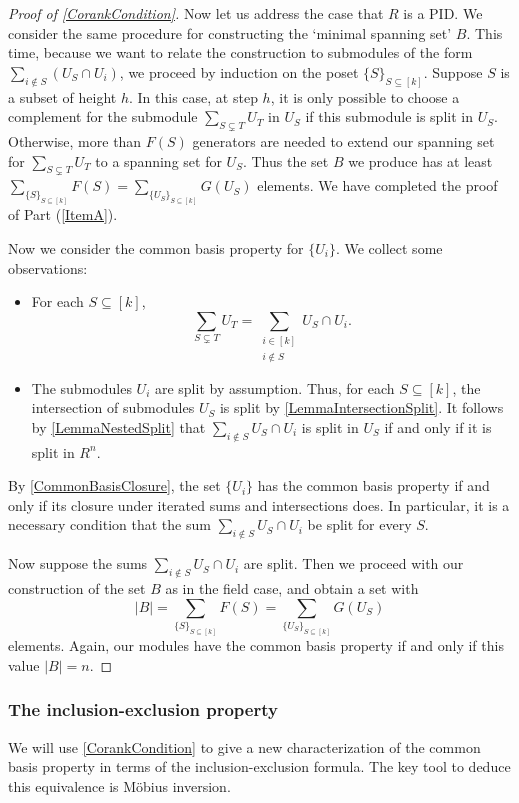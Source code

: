 \documentclass[a4paper]{amsart}
\numberwithin{theoremcounter}{section}
\theoremstyle{definition}
\theoremstyle{remark}
\begin{document}
\begin{proof}[Proof of \autoref{CorankCondition}]
Now let us address the case that $R$ is a PID. We consider the same procedure for constructing the `minimal spanning set' $B$. This time, because we want to relate the construction to submodules of the form $\sum_{i \notin S} (U_S \cap U_i)$, we proceed by induction on the poset $\{S\}_{S \subseteq [k]}$. Suppose $S$ is a subset of height $h$.   In this case, at step $h$, it is only possible to choose a complement for the submodule 
$\sum_{S \subsetneq T} U_T$ in $U_S$ if this submodule is split in $U_S$. Otherwise, more than $F(S)$ generators are needed to extend our spanning set for $\sum_{S \subsetneq T} U_T$ to a spanning set for $U_S$. Thus the set $B$ we produce has at least $  \sum_{\{S\}_{S \subseteq [k]}} F(S) =  \sum_{\{U_S\}_{S \subseteq [k]}} G(U_S) $ elements. We have completed the proof of Part (\ref{ItemA}). 

Now we consider the common basis property for $\{U_i\}$. We collect some observations: 
\begin{itemize} 
\item For each $S \subseteq [k]$,
$$\sum_{S \subsetneq T} U_T 
= \sum_{\substack{ i \in [k] \\ i \notin S}} U_S \cap U_i.$$
\item The submodules $U_i$ are split by assumption. Thus, for each $S \subseteq [k]$, the intersection of submodules $U_S$ is split by \autoref{LemmaIntersectionSplit}. It follows by \autoref{LemmaNestedSplit} that $\sum_{i \notin S} U_S \cap U_i$ is split in $U_S$ if and only if it is split in $R^n$. 
\end{itemize} 

By \autoref{CommonBasisClosure}, the set $\{U_i\}$ has the common basis property if and only if its closure under iterated sums and intersections does. In particular, it is a necessary condition that the sum $\sum_{i \notin S} U_S \cap U_i$ be split for every $S$. 

Now suppose the sums $\sum_{i \notin S} U_S \cap U_i$ are split. Then we proceed with our construction of the set $B$ as in the field case, and obtain a set  with $$ |B| = \sum_{\{S\}_{S \subseteq [k]}} F(S) =  \sum_{\{U_S\}_{S \subseteq [k]}} G(U_S) $$ elements. Again, our modules have the common basis property if and only if this value $|B|=n$.
\end{proof} 




\subsubsection{The inclusion-exclusion property} 
We will use \autoref{CorankCondition} to give a new characterization of the common basis property in terms of the inclusion-exclusion formula. The key tool to deduce this equivalence  is M\"obius inversion.
\end{document}
